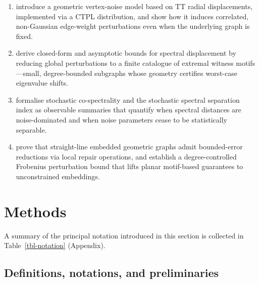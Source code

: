 \documentclass[
  11pt,
  letterpaper]{siamart251216}
\begin{document}
\begin{enumerate}
\def\labelenumi{\alph{enumi}.}
\item
  introduce a geometric vertex-noise model based on \ac{TT} radial
  displacements, implemented via a \ac{CTPL} distribution, and show how
  it induces correlated, non-Gaussian edge-weight perturbations even
  when the underlying graph is fixed.
\item
  derive closed-form and asymptotic bounds for spectral displacement by
  reducing global perturbations to a finite catalogue of extremal
  witness motifs---small, degree-bounded subgraphs whose geometry
  certifies worst-case eigenvalue shifts.
\item
  formalise stochastic co-spectrality and the stochastic spectral
  separation index as observable summaries that quantify when spectral
  distances are noise-dominated and when noise parameters cease to be
  statistically separable.
\item
  prove that straight-line embedded geometric graphs admit bounded-error
  reductions via local repair operations, and establish a
  degree-controlled Frobenius perturbation bound that lifts planar
  motif-based guarantees to unconstrained embeddings.
\end{enumerate}

\section{Methods}\label{sec-methods}

A summary of the principal notation introduced in this section is
collected in Table~\ref{tbl-notation} (Appendix).

\subsection{Definitions, notations, and preliminaries}\label{sec-defs}
\end{document}
